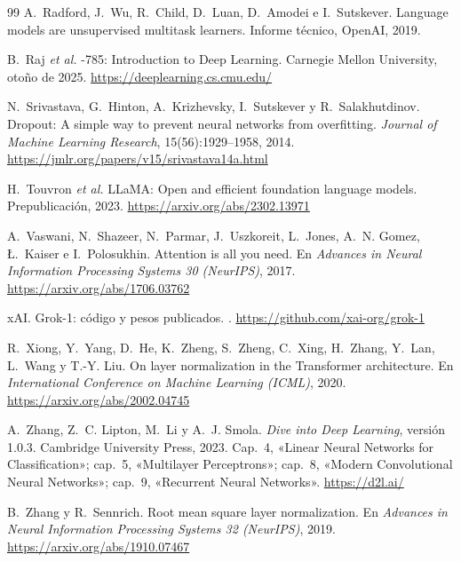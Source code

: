 \begin{thebibliography}{99}
A.~Radford, J.~Wu, R.~Child, D.~Luan, D.~Amodei e I.~Sutskever.
\newblock Language models are unsupervised multitask learners.
\newblock Informe técnico, OpenAI, 2019.

B.~Raj \emph{et al.}
-785: Introduction to Deep Learning.
\newblock Carnegie Mellon University, otoño de 2025.
\newblock \url{https://deeplearning.cs.cmu.edu/}

N.~Srivastava, G.~Hinton, A.~Krizhevsky, I.~Sutskever y R.~Salakhutdinov.
\newblock Dropout: A simple way to prevent neural networks from overfitting.
\newblock \emph{Journal of Machine Learning Research}, 15(56):1929--1958, 2014.
\newblock \url{https://jmlr.org/papers/v15/srivastava14a.html}

H.~Touvron \emph{et al.}
\newblock LLaMA: Open and efficient foundation language models.
\newblock Prepublicación, 2023.
\newblock \url{https://arxiv.org/abs/2302.13971}

A.~Vaswani, N.~Shazeer, N.~Parmar, J.~Uszkoreit, L.~Jones, A.~N. Gomez, Ł.~Kaiser e I.~Polosukhin.
\newblock Attention is all you need.
\newblock En \emph{Advances in Neural Information Processing Systems 30 (NeurIPS)}, 2017.
\newblock \url{https://arxiv.org/abs/1706.03762}

xAI.
\newblock Grok-1: código y pesos publicados.
.
\newblock \url{https://github.com/xai-org/grok-1}

R.~Xiong, Y.~Yang, D.~He, K.~Zheng, S.~Zheng, C.~Xing, H.~Zhang, Y.~Lan, L.~Wang y T.-Y. Liu.
\newblock On layer normalization in the Transformer architecture.
\newblock En \emph{International Conference on Machine Learning (ICML)}, 2020.
\newblock \url{https://arxiv.org/abs/2002.04745}

A.~Zhang, Z.~C. Lipton, M.~Li y A.~J. Smola.
\newblock \emph{Dive into Deep Learning}, versión 1.0.3.
\newblock Cambridge University Press, 2023.
\newblock Cap.~4, «Linear Neural Networks for Classification»; cap.~5, «Multilayer Perceptrons»; cap.~8, «Modern Convolutional Neural Networks»; cap.~9, «Recurrent Neural Networks».
\newblock \url{https://d2l.ai/}

B.~Zhang y R.~Sennrich.
\newblock Root mean square layer normalization.
\newblock En \emph{Advances in Neural Information Processing Systems 32 (NeurIPS)}, 2019.
\newblock \url{https://arxiv.org/abs/1910.07467}

\end{thebibliography}
